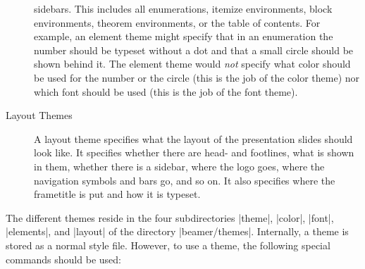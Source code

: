 \begin{description}
  sidebars. This includes all enumerations, itemize environments,
  block environments, theorem environments, or the table of
  contents. For example, an element theme might
  specify that in an enumeration the number should be typeset without
  a dot and that a small circle should be shown behind it. The element
  theme would \emph{not} specify what color should be used for the
  number or the circle (this is the job of the color theme) nor which font
  should be used (this is the job of the font theme).
\item[Layout Themes]
  A layout theme specifies what the layout of the presentation slides
  should look like. It specifies whether there are head- and
  footlines, what is shown in them, whether there is a sidebar, where
  the logo goes, where the navigation symbols and bars go, and so
  on. It also specifies where the frametitle is put and how it is
  typeset. 
\end{description}

The different themes reside in the four subdirectories |theme|, |color|,
|font|, |elements|, and |layout| of the directory
|beamer/themes|. Internally, a theme is stored as a normal style
file. However, to use a theme, the following special commands should
be used:






